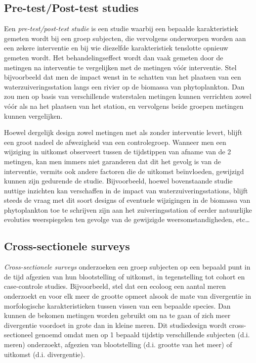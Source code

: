 \documentclass[
  12pt,dutch,coursenotes]{book}
\begin{document}
\hypertarget{subsec:prepost}{%
\subsection{Pre-test/Post-test studies}\label{subsec:prepost}}

Een \emph{pre-test/post-test studie} is een studie waarbij een bepaalde
karakteristiek gemeten wordt bij een groep subjecten, die vervolgens
onderworpen worden aan een zekere interventie en bij wie diezelfde
karakteristiek tenslotte opnieuw gemeten wordt. Het behandelingseffect wordt
dan vaak gemeten door de metingen na interventie te vergelijken met de
metingen vóór interventie.
Stel bijvoorbeeld dat men de impact wenst in te schatten van het plaatsen van een waterzuiveringsstation langs een rivier op de biomassa van phytoplankton. Dan zou men op basis van verschillende waterstalen metingen kunnen verrichten zowel vóór als na het plaatsen van het station, en vervolgens beide groepen metingen kunnen vergelijken.

Hoewel dergelijk design zowel metingen met als zonder interventie levert,
blijft een groot nadeel de afwezigheid van een controlegroep. Wanneer men
een wijziging in uitkomst observeert tussen de tijdstippen van afname van de
2 metingen, kan men immers niet garanderen dat dit het gevolg is van de
interventie, vermits ook andere factoren die de uitkomst beïnvloeden,
gewijzigd kunnen zijn gedurende de studie. Bijvoorbeeld, hoewel bovenstaande studie nuttige inzichten kan verschaffen in de impact van waterzuiveringsstations, blijft steeds de vraag met dit soort designs of eventuele wijzigingen in de biomassa van phytoplankton toe te schrijven zijn aan het zuiveringsstation of eerder natuurlijke evoluties weerspiegelen ten gevolge van de gewijzigde weersomstandigheden, etc\ldots{}

\hypertarget{cross-sectionele-surveys}{%
\subsection{Cross-sectionele surveys}\label{cross-sectionele-surveys}}

\emph{Cross-sectionele surveys} onderzoeken een groep subjecten op een
bepaald punt in de tijd afgezien van hun blootstelling of uitkomst, in
tegenstelling tot cohort en case-controle studies. Bijvoorbeeld, stel dat een ecoloog een aantal meren onderzoekt en voor elk meer de grootte opmeet alsook de mate van divergentie in morfologische karakteristieken tussen vissen van een bepaalde species.
Dan kunnen de bekomen metingen worden gebruikt om na te gaan of zich meer divergentie voordoet in grote dan in kleine meren. Dit studiedesign wordt cross-sectioneel genoemd omdat men op 1 bepaald tijdstip verschillende subjecten (d.i. meren) onderzoekt, afgezien van blootstelling (d.i. grootte van het meer) of uitkomst (d.i. divergentie).
\end{document}
